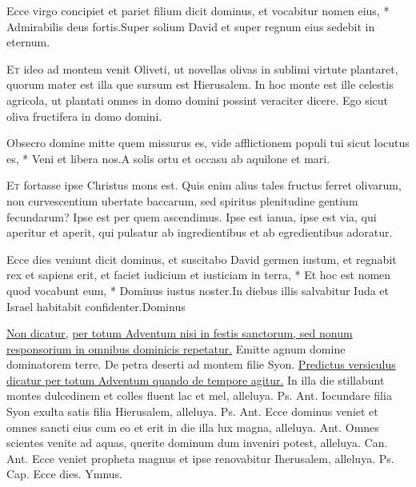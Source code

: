 \begin{multicols*}{2}
\begin{responsory}
{Ecce virgo concipiet et pariet filium dicit dominus, et vocabitur nomen eius, * Admirabilis deus fortis.}{Super solium David et super regnum eius sedebit in eternum.}
\end{responsory}
\lettrine[lines=2]{\zallmancaps \color{Blue} E}{t} ideo ad montem venit Oliveti, ut novellas olivas in sublimi virtute plantaret, quorum mater est illa que sursum est Hierusalem. In hoc monte est ille celestis agricola, ut plantati omnes in domo domini possint veraciter dicere. Ego sicut oliva fructifera in domo domini.
\begin{responsory}
{Obsecro domine mitte quem missurus es, vide afflictionem populi tui sicut locutus es, * Veni et libera nos.}{A solis ortu et occasu ab aquilone et mari.}
\end{responsory}
\lettrine[lines=2]{\zallmancaps \color{Red} E}{t} fortasse ipse Christus mons est. Quis enim alius tales fructus ferret olivarum, non curvescentium ubertate baccarum, sed spiritus plenitudine gentium fecundarum? Ipse est per quem ascendimus. Ipse est ianua, ipse est via, qui aperitur et aperit, qui pulsatur ab ingredientibus et ab egredientibus adoratur.
\begin{responsory-final}
{Ecce dies veniunt dicit dominus, et suscitabo David germen iustum, et regnabit rex et sapiens erit, et faciet iudicium et iusticiam in terra, * Et hoc est nomen quod vocabunt eum, * Dominus iustus noster.}{In diebus illis salvabitur Iuda et Israel habitabit confidenter.}{Dominus}
\end{responsory-final}
\newline \ul{Non dicatur,}  \ul{per totum Adventum nisi in festis sanctorum, sed nonum responsorium in omnibus dominicis repetatur.}
\newline \V Emitte agnum domine dominatorem terre.
\newline \R De petra deserti ad montem filie Syon.
\newline \ul{Predictus versiculus dicatur per totum Adventum quando de tempore agitur.}
 In illa die stillabunt montes dulcedinem et colles fluent lac et mel, alleluya. {\color{Red} Ps.}  {\color{Red} Ant.} Iocundare filia Syon exulta satis filia Hierusalem, alleluya. {\color{Red} Ps.}  {\color{Red} Ant.} Ecce dominus veniet et omnes sancti eius cum eo et erit in die illa lux magna, alleluya.  {\color{Red} Ant.} Omnes scientes venite ad aquas, querite dominum dum inveniri potest, alleluya. {\color{Red} Can.}  {\color{Red} Ant.} Ecce veniet propheta magnus et ipse renovabitur Iherusalem, alleluya. {\color{Red} Ps.}  {\color{Red} Cap.} Ecce dies. {\color{Red} Ymnus.}

\end{multicols*}

